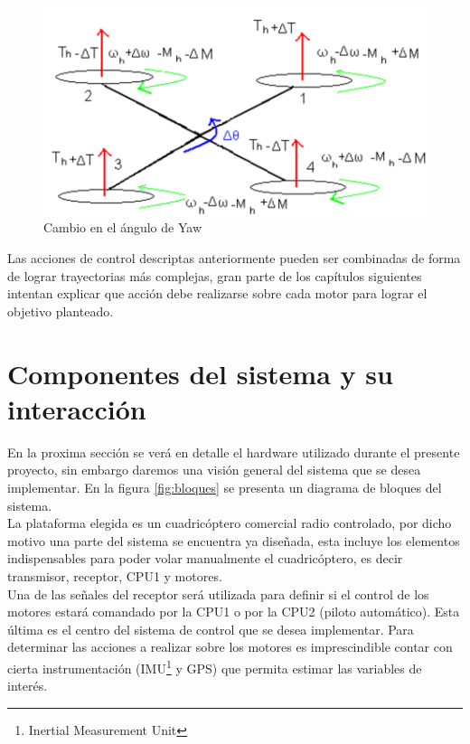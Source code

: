 \documentclass[main]{subfiles}
\begin{document}
\begin{figure}[!h]
\centering
\includegraphics[scale=0.5]{./pics_general/quad_theta.pdf}
\caption{Cambio en el \'angulo de Yaw}
\label{fig:quad_theta}
\end{figure}
Las acciones de control descriptas anteriormente pueden ser combinadas de forma de lograr trayectorias m\'as complejas, gran parte de los cap\'itulos siguientes intentan explicar que acci\'on debe realizarse sobre cada motor para lograr el objetivo planteado.

\section{Componentes del sistema y su interacci\'on}

En la proxima secci\'on se ver\'a en detalle el hardware utilizado durante el presente proyecto, sin embargo daremos una visi\'on general del sistema que se desea implementar. En la figura \ref{fig:bloques} se presenta un diagrama de bloques del sistema.\\

La plataforma elegida es un cuadric\'optero comercial radio controlado, por dicho motivo una parte del sistema se encuentra ya diseñada, esta incluye los elementos indispensables para poder volar manualmente el cuadric\'optero, es decir transmisor, receptor, CPU1 y motores.\\   

Una de las señales del receptor ser\'a utilizada para definir si el control de los motores estar\'a comandado por la CPU1 o por la CPU2 (piloto autom\'atico). Esta \'ultima es el centro del sistema de control que se desea implementar. Para determinar las acciones a realizar sobre los motores es imprescindible contar con cierta instrumentaci\'on (IMU\footnote{Inertial Measurement Unit} y GPS) que permita estimar las variables de inter\'es.\\
\end{document}
